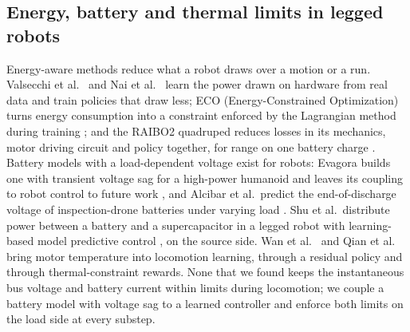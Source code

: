 \subsection{Energy, battery and thermal limits in legged robots}\label{sec:rw-energy}
Energy-aware methods reduce what a robot draws over a motion or a run. Valsecchi et al.\ \cite{valsecchi2024power} and Nai et al.\ \cite{nai2025power} learn the power drawn on hardware from real data and train policies that draw less; ECO (Energy-Constrained Optimization) turns energy consumption into a constraint enforced by the Lagrangian method during training \cite{huang2026eco}; and the RAIBO2 quadruped reduces losses in its mechanics, motor driving circuit and policy together, for range on one battery charge \cite{lee2026raibo2}. Battery models with a load-dependent voltage exist for robots: Evagora builds one with transient voltage sag for a high-power humanoid and leaves its coupling to robot control to future work \cite{evagora2025battery}, and Alcibar et al.\ predict the end-of-discharge voltage of inspection-drone batteries under varying load \cite{alcibar2025drone}. Shu et al.\ distribute power between a battery and a supercapacitor in a legged robot with learning-based model predictive control \cite{shu2025hess}, on the source side. Wan et al.\ \cite{wan2026thermal} and Qian et al.\ \cite{qian2026thermal} bring motor temperature into locomotion learning, through a residual policy and through thermal-constraint rewards. None that we found keeps the instantaneous bus voltage and battery current within limits during locomotion; we couple a battery model with voltage sag to a learned controller and enforce both limits on the load side at every substep.

